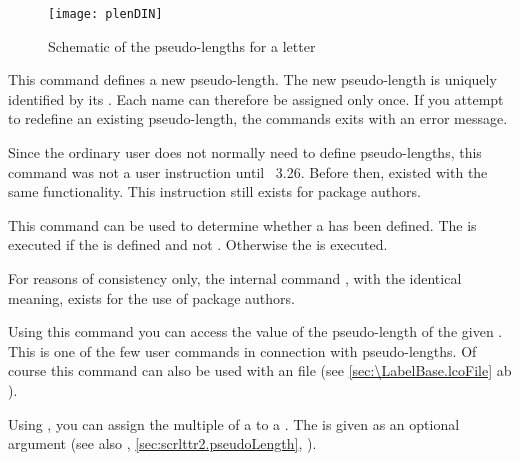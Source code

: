 \begin{figure}
  \centering
  \texttt{[image: plenDIN]}
  \caption{Schematic of the pseudo-lengths for a letter}
  \label{fig:scrlttr2-experts.pseudoLength}
\end{figure}


\begin{Declaration}
\end{Declaration}
This command
defines a new pseudo-length. The new pseudo-length is uniquely identified by
its . Each name can therefore be assigned only once. If you
attempt to redefine an existing pseudo-length, the commands exits with an
error message.

%
Since the ordinary user does not normally need to define pseudo-lengths, this
command was not a user instruction until \KOMAScript~3.26. Before then,
 existed with the same functionality. This instruction still
exists for package authors.%
\EndIndexGroup


\begin{Declaration}
\end{Declaration}
This command can be
used to determine whether a  has been defined. The
 is executed if the  is defined and not
. Otherwise the  is executed.

%
For reasons of consistency only, the internal command ,
with the identical meaning, exists for the use of package authors.%
\EndIndexGroup


\begin{Declaration}
\end{Declaration}
Using this command you can access the value of the pseudo-length of
the given . This is one of the few user commands in
connection with pseudo-lengths. Of course this command can also be
used with an  file (see
\autoref{sec:\LabelBase.lcoFile} ab ).%
%
\EndIndexGroup


\begin{Declaration}
\end{Declaration}
Using , you can assign the multiple of a
 to a . The  is given as an
optional argument (see also ,
\autoref{sec:scrlttr2.pseudoLength},
).

